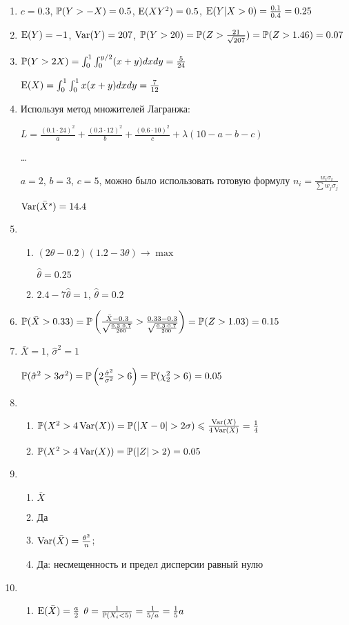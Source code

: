 \begin{enumerate}
\item $c=0.3$, $\P(Y>-X)=0.5$, $\E(XY^{2})=0.5$, $\E(Y|X>0)=\frac{0.1}{0.4}=0.25$
\item $\E(Y)=-1$, $\Var(Y)=207$, $\P(Y>20)=\P(Z>\frac{21}{\sqrt{207}})=\P(Z>1.46)=0.07$
\item $\P(Y>2X)=\int_{0}^{1}\int_{0}^{y/2}(x+y)dxdy=\frac{5}{24}$

$\E(X)=\int_{0}^{1}\int_{0}^{1}x(x+y)dxdy=\frac{7}{12}$
\item Используя метод множителей Лагранжа:

$L=\frac{(0.1\cdot 24)^{2}}{a}+\frac{(0.3\cdot 12)^{2}}{b}+\frac{(0.6\cdot 10)^{2}}{c}+\lambda(10-a-b-c)$

\ldots

$a=2$, $b=3$, $c=5$, можно было использовать готовую формулу
$n_{i}=\frac{w_{i}\sigma_{i}}{\sum w_{j}\sigma_{j}}$

$\Var(\bar X^{s})=14.4$
\item
\begin{enumerate}
\item $(2\theta-0.2)(1.2-3\theta)\rightarrow\max$

$\hat{\theta}=0.25$
\item $2.4-7\hat{\theta}=1$, $\hat{\theta}=0.2$
\end{enumerate}
\item $\P(\bar X>0.33)=\P\left(\frac{\bar{X}-0.3}{\sqrt{\frac{0.3\cdot
0.7}{200}}}>\frac{0.33-0.3}{\sqrt{\frac{0.3\cdot
0.7}{200}}}\right)=\P(Z>1.03)=0.15$
\item $\bar{X}=1$, $\hat{\sigma}^{2}=1$

$\P(\hat{\sigma}^{2}>3\sigma^{2})=\P\left(2\frac{\hat{\sigma}^{2}}{\sigma^{2}}>6\right)=\P(\chi_{2}^{2}>6)=0.05$
\item
\begin{enumerate}
\item $\P(X^{2}>4\Var(X))=\P(|X-0|>2\sigma)\le
\frac{\Var(X)}{4\Var(X)}=\frac{1}{4}$
\item $\P(X^{2}>4\Var(X))=\P(|Z|>2)=0.05$
\end{enumerate}
\item
\begin{enumerate}
\item $\bar X$
\item Да
\item $\Var(\bar X)=\frac{\theta^{2}}{n}$;
\item Да: несмещенность и предел дисперсии равный нулю
\end{enumerate}
\item
\begin{enumerate}
\item $\E(\bar X)=\frac{a}{2}$
$\theta=\frac{1}{\P(X_{i}<5)}=\frac{1}{5/a}=\frac{1}{5}a$


\end{enumerate}
\end{enumerate}
